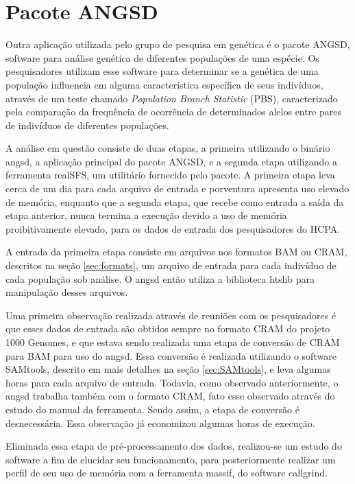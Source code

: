 \documentclass[cic,tc]{iiufrgs}
\begin{document}
\section{Pacote ANGSD}
\label{sec:angsd}

Outra aplicação utilizada pelo grupo de pesquisa em genética é o pacote ANGSD,
software para análise genética de diferentes populações de uma
espécie.\cite{korneliussen2014angsd} Os pesquisadores utilizam esse software
para determinar se a genética de uma população influencia em alguma
característica específica de seus indivíduos, através de um teste chamado
\textit{Population Branch Statistic} (PBS), caracterizado pela comparação da
frequência de ocorrência de determinados alelos entre pares de
indivíduos de diferentes populações.\cite{yi2010sequencing}

A análise em questão consiste de duas etapas, a primeira utilizando o binário
angsd, a aplicação principal do pacote ANGSD, e a segunda etapa utilizando a
ferramenta realSFS, um utilitário fornecido pelo pacote. A primeira etapa leva
cerca de um dia para cada arquivo de entrada e porventura apresenta uso elevado
de memória, enquanto que a segunda etapa, que recebe como entrada a saída da
etapa anterior, nunca termina a execução devido a uso de memória
proibitivamente elevado, para os dados de entrada dos pesquisadores do HCPA.

A entrada da primeira etapa consiste em arquivos nos formatos BAM ou CRAM,
descritos na seção \ref{sec:formats}, um arquivo de entrada para cada indivíduo
de cada população sob análise. O angsd então utiliza a biblioteca
htslib\cite{bonfield2021htslib} para manipulação desses arquivos.

Uma primeira observação realizada através de reuniões com os pesquisadores é
que esses dados de entrada são obtidos sempre no formato CRAM do projeto 1000
Genomes, e que estava sendo realizada uma etapa de conversão de CRAM para BAM
para uso do angsd. Essa conversão é realizada utilizando o software SAMtools,
descrito em mais detalhes na seção \ref{sec:SAMtools}, e leva algumas horas
para cada arquivo de entrada. Todavia, como observado anteriormente, o angsd
trabalha também com o formato CRAM, fato esse observado através do estudo do
manual da ferramenta. Sendo assim, a etapa de conversão é desnecessária. Essa
observação já economizou algumas horas de execução.

Eliminada essa etapa de pré-processamento dos dados, realizou-se um estudo do
software a fim de elucidar seu funcionamento, para posteriormente realizar um
perfil de seu uso de memória com a ferramenta massif, do software
callgrind.\cite{weidendorfer2008sequential}
\end{document}
